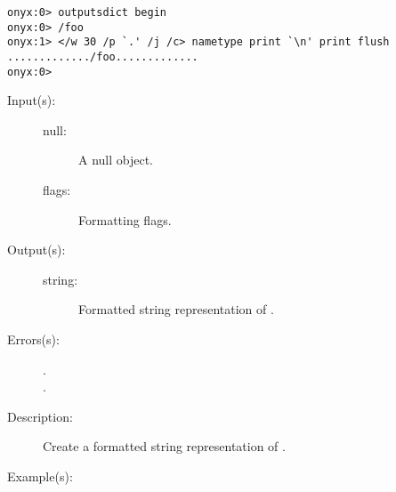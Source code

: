 \begin{description}
\begin{description}
\begin{verbatim}
onyx:0> outputsdict begin
onyx:0> /foo
onyx:1> </w 30 /p `.' /j /c> nametype print `\n' print flush
............./foo.............
onyx:0>
		\end{verbatim}
	\end{description}
\label{outputsdict:nulltype}
\item[{\onyxop{null flags}{nulltype}{string}}: ]
	\begin{description}\item[]
	\item[Input(s): ]
		\begin{description}\item[]
		\item[null: ]
			A null object.
		\item[flags: ]
			Formatting flags.
		\end{description}
	\item[Output(s): ]
		\begin{description}\item[]
		\item[string: ]
			Formatted string representation of .
		\end{description}
	\item[Errors(s): ]
		\begin{description}\item[]
		\item[.]
		\item[.]
		\end{description}
	\item[Description: ]
		Create a formatted string representation of .
	\item[Example(s): ]\begin{verbatim}


\end{verbatim}
\end{description}
\end{description}
